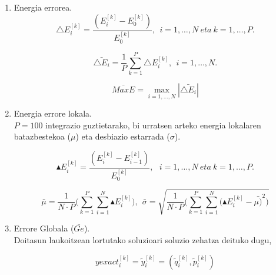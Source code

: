 \begin{enumerate}

           \item Energia errorea.\\
           \begin{equation*}
           \triangle E_i^{[k]}=\frac{(E^{[k]}_i-E^{[k]}_0)}{E^{[k]}_0}, \ \ i=1,\dots,N \ eta \ k=1,\dots,P.
           \end{equation*}  
           
           \begin{equation*}
           \bar{\triangle E_i}=\frac{1}{P} \sum_{k=1}^{P} \triangle E_i^{[k]}, \ \ i=1,\dots,N.
           \end{equation*}
           
           \begin{equation*}
           \bar{MaxE}=\max_{i=1,\dots,N} |\bar{\triangle E_i}|
           \end{equation*}

           \item Energia errore lokala.\\ 
            $P=100$ integrazio guztietarako, bi urratsen arteko energia lokalaren batazbestekoa ($\mu$) eta desbiazio estarrada ($\sigma$). 
            
           \begin{equation*}
             \blacktriangle E_i^{[k]}=\frac{(E^{[k]}_i-E^{[k]}_{i-1})}{E^{[k]}_0},\ \ \ i=1,\dots,N \ eta \ k=1,\dots,P.          
           \end{equation*}
           
           \begin{equation*}
            \bar{\mu}= \frac{1}{N\cdot P} \bigg(\sum_{k=1}^{P} \sum_{i=1}^{N} {\blacktriangle E_i^{[k]}\bigg)}, \ \
            \bar{\sigma} = \sqrt{\frac{1}{N\cdot P} \bigg(\sum_{k=1}^{P} \sum_{i=1}^{N} {(\blacktriangle E_i^{[k]}-\bar{\mu)}^2}\bigg)}
           \end{equation*}
           
           \item Errore Globala ($\bar{Ge}$).\\
            Doitasun laukoitzean lortutako soluzioari soluzio zehatza deituko dugu,
            
            \begin{equation*}
            yexact^{[k]}_i=\tilde{y}^{[k]}_i=(\tilde{q}^{[k]}_i,\tilde{p}^{[k]}_i)
            \end{equation*}


\end{enumerate}
